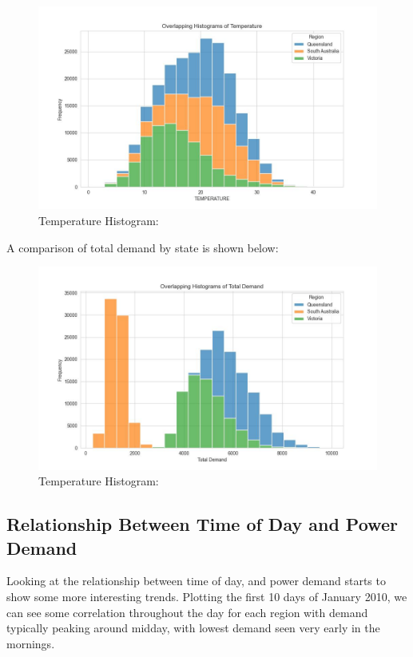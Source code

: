 \documentclass[mstat,12pt]{unswthesis}
\begin{document}
\begin{figure}
\centering
\includegraphics{img/Hist_Temperature.jpg}
\caption{Temperature Histogram:}
\end{figure}

A comparison of total demand by state is shown below:

\begin{figure}
\centering
\includegraphics{img/Hist_TotalDemand.jpg}
\caption{Temperature Histogram:}
\end{figure}

\subsection{Relationship Between Time of Day and Power
Demand}\label{relationship-between-time-of-day-and-power-demand}

Looking at the relationship between time of day, and power demand starts
to show some more interesting trends. Plotting the first 10 days of
January 2010, we can see some correlation throughout the day for each
region with demand typically peaking around midday, with lowest demand
seen very early in the mornings.
\end{document}
